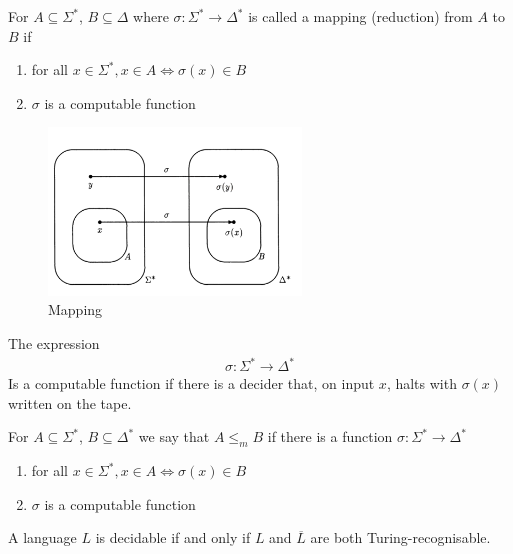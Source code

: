 \documentclass[a4paper]{article}
\theoremstyle{plain}
\newtheorem{thm}{Theorem}[section]
\theoremstyle{definition}
\newtheorem{defn}{Definition}[section]
\theoremstyle{remark}
\begin{document}
\begin{tcolorbox}[colback=black!3!white,colframe=black!60!white,title=\begin{defn}Mapping \label{Reductions}\end{defn}]
For $A \subseteq \Sigma^{*}$, $B \subseteq \Delta$ where $\sigma : \Sigma^{*} \to \Delta^{*}$ is called a mapping (reduction) from $A$ to $B$ if
\begin{enumerate}
	\item for all $x \in \Sigma^{*}, x \in A \iff \sigma(x) \in B$ 
	\item $\sigma$ is a computable function
\end{enumerate}
\begin{figure}[H]
	\centering
	\includegraphics[width=0.6\textwidth]{eighteen.png}
	\caption{Mapping}
	\label{fig:eighteen-png}
\end{figure}
\end{tcolorbox}
\begin{tcolorbox}[colback=black!3!white,colframe=black!60!white,title=\begin{defn}Computability \label{Computability}\end{defn}]
The expression
\begin{align}
\sigma : \Sigma^{*} \to \Delta^{*}
\end{align}
Is a computable function if there is a decider that, on input $x$, halts with $\sigma(x)$ written on the tape.
\end{tcolorbox}
\begin{tcolorbox}[colback=black!3!white,colframe=black!60!white,title=\begin{defn}Reduction \label{Reduction}\end{defn}]
For $A \subseteq \Sigma^{*}$, $B \subseteq \Delta^{*}$ we say that $A \le_m B$ if there is a function  $\sigma : \Sigma^{*} \to \Delta^{*}$
\begin{enumerate}
	\item for all $x \in \Sigma^{*}, x \in A \iff \sigma(x) \in B$ 
	\item $\sigma$ is a computable function
\end{enumerate}
\end{tcolorbox}
\begin{tcolorbox}[colback=black!3!white,colframe=black!60!white,title=\begin{thm}Decidable \label{Decidable}\end{thm}]
	A language $L$ is decidable if and only if $L$ and $\overline{L}$ are both Turing-recognisable. 
		\begin{align}
		
		\end{align}
\end{tcolorbox}
\end{document}
